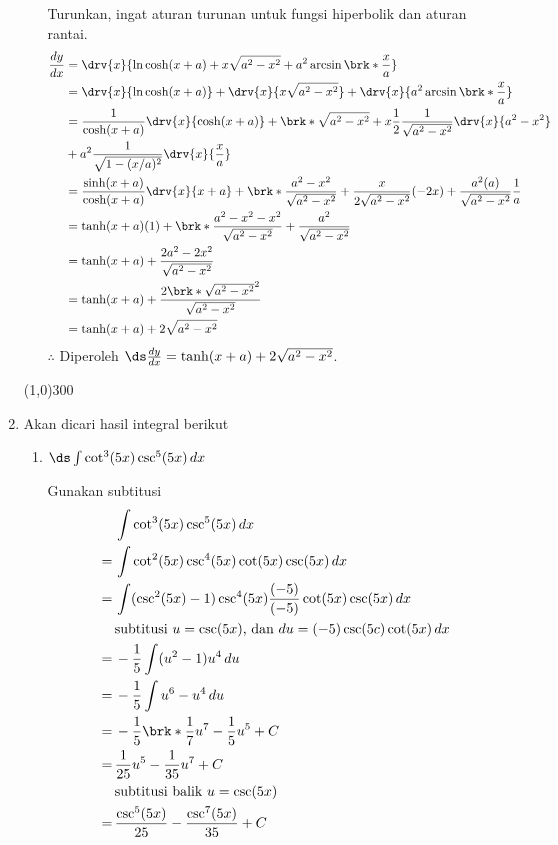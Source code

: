 \begin{enumerate}[leftmargin=*, label={\arabic*}.]
\begin{enumerate}[label={\alph*}.]
    Turunkan, ingat aturan turunan untuk fungsi hiperbolik dan aturan rantai.
    \begin{align*}
        \frac{dy}{dx}&=\drv{x}{\ln\cosh(x+a)+x\sqrt{a^{2}-x^{2}}+a^{2}\arcsin\brk*{\frac{x}{a}}}\\
        &=\drv{x}{\ln\cosh(x+a)}+\drv{x}{x\sqrt{a^{2}-x^{2}}}
        +\drv{x}{a^{2}\arcsin\brk*{\frac{x}{a}}}\\
        &=\frac{1}{\cosh(x+a)}\drv{x}{\cosh(x+a)}+\brk*{\sqrt{a^{2}-x^{2}}
        +x\frac{1}{2}\frac{1}{\sqrt{a^{2}-x^{2}}}\drv{x}{a^{2}-x^{2}}}\\
        &+a^{2}\frac{1}{\sqrt{1-(x/a)^{2}}}\drv{x}{\frac{x}{a}}\\
        &=\frac{\sinh(x+a)}{\cosh(x+a)}\drv{x}{x+a}+\brk*{\frac{a^{2}-x^{2}}{\sqrt{a^{2}-x^{2}}}
        +\frac{x}{2\sqrt{a^{2}-x^{2}}}(-2x)}+\frac{a^{2}(a)}{\sqrt{a^{2}-x^{2}}}\frac{1}{a}\\
        &=\tanh(x+a)(1)+\brk*{\frac{a^{2}-x^{2}-x^{2}}{\sqrt{a^{2}-x^{2}}}}
        +\frac{a^{2}}{\sqrt{a^{2}-x^{2}}}\\
        &=\tanh(x+a)+\frac{2a^{2}-2x^{2}}{\sqrt{a^{2}-x^{2}}}\\
        &=\tanh(x+a)+\frac{2\brk*{\sqrt{a^{2}-x^{2}}}^{2}}{\sqrt{a^{2}-x^{2}}}\\
        &=\tanh(x+a)+2\sqrt{a^{2}-x^{2}}\\
    \end{align*}
    $\therefore$ Diperoleh $\ds \frac{dy}{dx} = \tanh(x+a)+2\sqrt{a^{2}-x^{2}}$.
\end{enumerate}
\begin{center}
    \line(1,0){300}
\end{center}
\item Akan dicari hasil integral berikut
\begin{enumerate}[label={\alph*}.]
    \item $\ds \int \cot^{3}(5x)\csc^{5}(5x)\,dx$  
    
    Gunakan subtitusi
    \begin{align*}
        &\int \cot^{3}(5x)\csc^{5}(5x)\,dx\\
        =\,& \int \cot^{2}(5x)\csc^{4}(5x)\cot(5x)\csc(5x)\,dx\\
        =\,& \int (\csc^{2}(5x)-1)\csc^{4}(5x)\frac{(-5)}{(-5)}\cot(5x)\csc(5x)\,dx\\
        &\text{subtitusi $u=\csc(5x)$, dan $du = (-5)\csc(5c)\cot(5x)\,dx$}\\
        =\,&-\frac{1}{5} \int (u^{2}-1)u^{4}\,du\\
        =\,&-\frac{1}{5} \int u^{6}-u^{4}\,du\\
        =\,&-\frac{1}{5}\brk*{\frac{1}{7}u^{7}-\frac{1}{5}u^{5}}+C\\
        =\,&\frac{1}{25}u^{5}-\frac{1}{35}u^{7}+C\\
        &\text{subtitusi balik $u=\csc(5x)$}\\
        =\,&\frac{\csc^{5}(5x)}{25}-\frac{\csc^{7}(5x)}{35}+C
    \end{align*}


\end{enumerate}
\end{enumerate}
